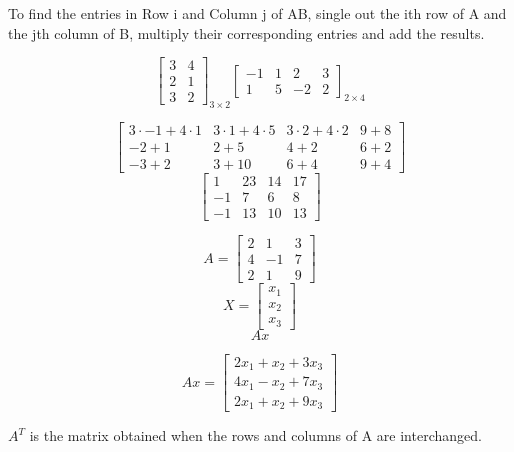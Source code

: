 To find the entries in Row i and Column j of AB, single out the ith row of A and the jth column of
B, multiply their corresponding entries and add the results.


\begin{example}[]
	\[\begin{bmatrix} 3 & 4 \\ 2 & 1 \\ 3 & 2 \end{bmatrix}_{3\times 2}  \begin{bmatrix} -1 & 1 & 2 & 3 \\ 1 & 5 & -2 & 2 \end{bmatrix}_{2\times 4}\]
\end{example}

\begin{solution}[]
	\[\begin{bmatrix} 3 \cdot -1 + 4 \cdot 1 & 3 \cdot 1 + 4 \cdot 5 & 3 \cdot 2 + 4 \cdot 2 & 9 + 8 \\ -2 + 1 & 2 + 5 & 4 + 2 & 6 + 2 \\
	-3 + 2 & 3 + 10 & 6 + 4 & 9 + 4\end{bmatrix} \]
	\[\begin{bmatrix} 1 & 23 & 14 & 17 \\ -1 & 7 & 6 & 8  \\ -1 & 13 & 10 & 13  \end{bmatrix} \]
\end{solution}

\begin{example}[]
	\[A = \begin{bmatrix} 2 & 1 &3 \\ 4 & -1 & 7 \\ 2 & 1 & 9 \end{bmatrix} \]
	\[X = \begin{bmatrix} x_1 \\ x_2 \\ x_3 \end{bmatrix} \]
	\[Ax\]
\end{example}
\begin{solution}[]
	\[Ax = \begin{bmatrix} 2x_1 + x_2 + 3x_3 \\ 4x_1 - x_2 +7 x_3 \\ 2x_1 + x_2 +9 x_3\end{bmatrix} \]
\end{solution}


\begin{definition}
	$A^T$ is the matrix obtained when the rows and columns of A are interchanged.
\end{definition}

